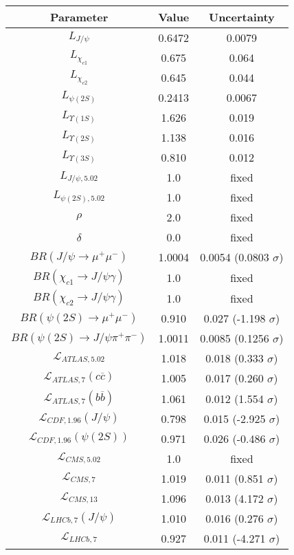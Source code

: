 \begin{table}[h!]
\centering
\begin{tabular}{c|c|c}
Parameter & Value & Uncertainty \\
\hline
$L_{J/\psi}$ & 0.6472 & 0.0079 \\
$L_{\chi_{c1}}$ & 0.675 & 0.064 \\
$L_{\chi_{c2}}$ & 0.645 & 0.044 \\
$L_{\psi(2S)}$ & 0.2413 & 0.0067 \\
$L_{\Upsilon(1S)}$ & 1.626 & 0.019 \\
$L_{\Upsilon(2S)}$ & 1.138 & 0.016 \\
$L_{\Upsilon(3S)}$ & 0.810 & 0.012 \\
$L_{J/\psi,5.02}$ & 1.0 & fixed \\
$L_{\psi(2S),5.02}$ & 1.0 & fixed \\
$\rho$ & 2.0 & fixed \\
$\delta$ & 0.0 & fixed \\
$BR(J/\psi\rightarrow\mu^+\mu^-)$ & 1.0004 & 0.0054 (0.0803 $\sigma$) \\
$BR(\chi_{c1}\rightarrow J/\psi\gamma)$ & 1.0 & fixed \\
$BR(\chi_{c2}\rightarrow J/\psi\gamma)$ & 1.0 & fixed \\
$BR(\psi(2S)\rightarrow\mu^+\mu^-)$ & 0.910 & 0.027 (-1.198 $\sigma$) \\
$BR(\psi(2S)\rightarrow J/\psi\pi^+\pi^-)$ & 1.0011 & 0.0085 (0.1256 $\sigma$) \\
$\mathcal L_{ATLAS,5.02}$ & 1.018 & 0.018 (0.333 $\sigma$) \\
$\mathcal L_{ATLAS,7}(c\overline c)$ & 1.005 & 0.017 (0.260 $\sigma$) \\
$\mathcal L_{ATLAS,7}(b\overline b)$ & 1.061 & 0.012 (1.554 $\sigma$) \\
$\mathcal L_{CDF,1.96}(J/\psi)$ & 0.798 & 0.015 (-2.925 $\sigma$) \\
$\mathcal L_{CDF,1.96}(\psi(2S))$ & 0.971 & 0.026 (-0.486 $\sigma$) \\
$\mathcal L_{CMS,5.02}$ & 1.0 & fixed \\
$\mathcal L_{CMS,7}$ & 1.019 & 0.011 (0.851 $\sigma$) \\
$\mathcal L_{CMS,13}$ & 1.096 & 0.013 (4.172 $\sigma$) \\
$\mathcal L_{LHCb,7}(J/\psi)$ & 1.010 & 0.016 (0.276 $\sigma$) \\
$\mathcal L_{LHCb,7}$ & 0.927 & 0.011 (-4.271 $\sigma$) \\

\end{tabular}
\end{table}
